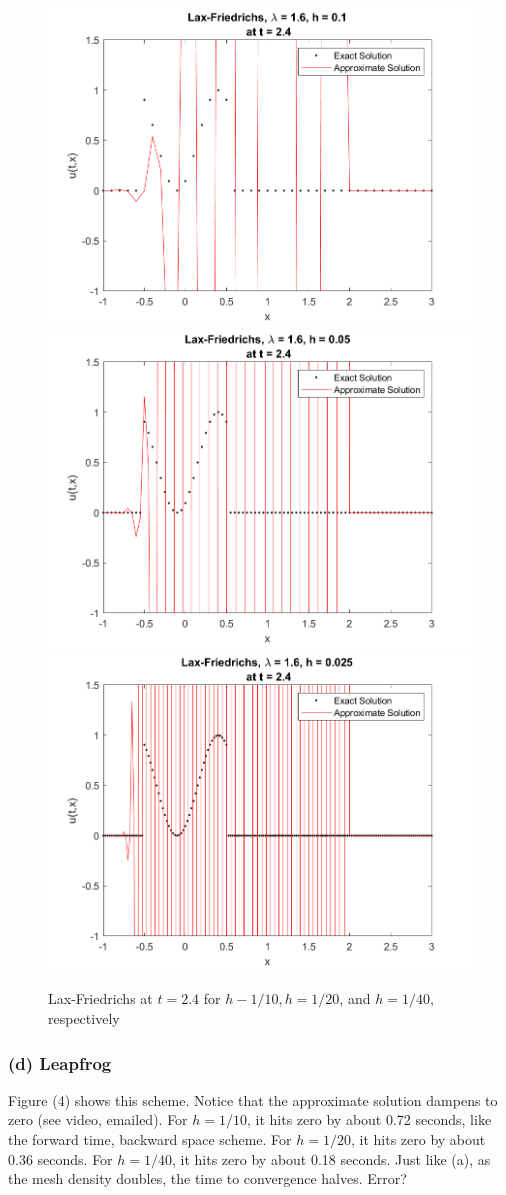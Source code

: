 \documentclass[12pt]{article}
\begin{document}
\begin{figure}
	\centering
	\includegraphics[width=.6\linewidth]{./code/c_lax_friedrichs_h_one_10th.png}	\includegraphics[width=.6\linewidth]{./code/c_lax_friedrichs_h_one_20th.png}
	\includegraphics[width=.6\linewidth]{./code/c_lax_friedrichs_h_one_40th.png}
	\caption{Lax-Friedrichs at $t=2.4$ for $h-1/10, h=1/20$, and $h=1/40$, respectively}
\end{figure}

\subsubsection*{(d) Leapfrog}

Figure (4) shows this scheme. Notice that the approximate solution dampens to zero (see video, emailed). For $h=1/10$, it hits zero by about 0.72 seconds, like the forward time, backward space scheme. For $h=1/20$, it hits zero by about 0.36 seconds. For $h=1/40$, it hits zero by about 0.18 seconds. Just like (a), as the mesh density doubles, the time to convergence halves. Error? 
\end{document}
